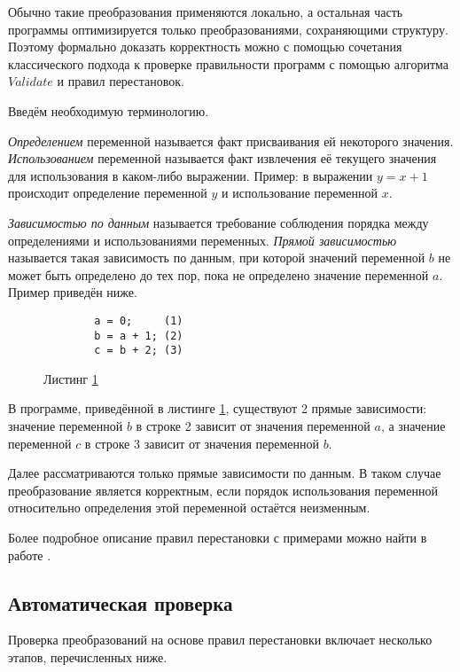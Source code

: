 Обычно такие преобразования применяются локально, а остальная часть программы оптимизируется только преобразованиями, сохраняющими структуру. Поэтому формально доказать корректность можно с помощью сочетания классического подхода к проверке правильности программ с помощью алгоритма $Validate$ и правил перестановок.

Введём необходимую терминологию.

\emph{Определением} переменной называется факт присваивания ей некоторого значения. \emph{Использованием} переменной называется факт извлечения её текущего значения для использования в каком-либо выражении. Пример: в выражении $y = x + 1$ происходит определение переменной $y$ и использование переменной $x$.

\emph{Зависимостью по данным} называется требование соблюдения порядка между определениями и использованиями переменных.
\emph{Прямой зависимостью} называется такая зависимость по данным, при которой значений переменной $b$ не может быть определено до тех пор, пока не определено значение переменной $a$. Пример приведён ниже.

\begin{figure}[!Hb]
    \label{fig:direct-dependency}
    \begin{verbatim}
        a = 0;     (1)
        b = a + 1; (2)
        c = b + 2; (3)
    \end{verbatim}
    Листинг \ref{fig:direct-dependency}
\end{figure}

В программе, приведённой в листинге \ref{fig:direct-dependency}, существуют 2 прямые зависимости: значение переменной $b$ в строке 2 зависит от значения переменной $a$, а значение переменной $c$ в строке 3 зависит от значения переменной $b$.

Далее рассматриваются только прямые зависимости по данным. В таком случае преобразование является корректным, если порядок использования переменной относительно определения этой переменной остаётся неизменным.

Более подробное описание правил перестановки с примерами можно найти в работе \cite{ZuckPFGH02}.

\subsection{Автоматическая проверка}

Проверка преобразований на основе правил перестановки включает несколько этапов, перечисленных ниже.


